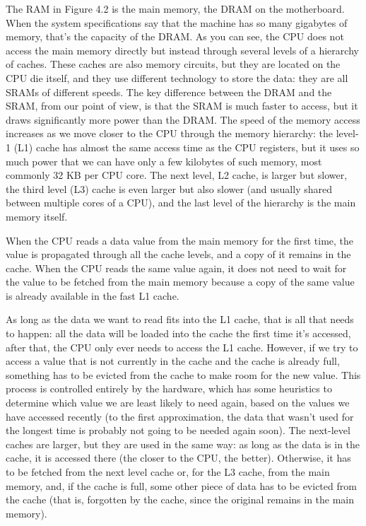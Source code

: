 The RAM in Figure 4.2 is the main memory, the DRAM on the motherboard. When the system specifications say that the machine has so many gigabytes of memory, that's the capacity of the DRAM. As you can see, the CPU does not access the main memory directly but instead through several levels of a hierarchy of caches. These caches are also memory circuits, but they are located on the CPU die itself, and they use different technology to store the data: they are all SRAMs of different speeds. The key difference between the DRAM and the SRAM, from our point of view, is that the SRAM is much faster to access, but it draws significantly more power than the DRAM. The speed of the memory access increases as we move closer to the CPU through the memory hierarchy: the level-1 (L1) cache has almost the same access time as the CPU registers, but it uses so much power that we can have only a few kilobytes of such memory, most commonly 32 KB per CPU core. The next level, L2 cache, is larger but slower, the third level (L3) cache is even larger but also slower (and usually shared between multiple cores of a CPU), and the last level of the hierarchy is the main memory itself.

When the CPU reads a data value from the main memory for the first time, the value is propagated through all the cache levels, and a copy of it remains in the cache. When the CPU reads the same value again, it does not need to wait for the value to be fetched from the main memory because a copy of the same value is already available in the fast L1 cache.

As long as the data we want to read fits into the L1 cache, that is all that needs to happen: all the data will be loaded into the cache the first time it's accessed, after that, the CPU only ever needs to access the L1 cache. However, if we try to access a value that is not currently in the cache and the cache is already full, something has to be evicted from the cache to make room for the new value. This process is controlled entirely by the hardware, which has some heuristics to determine which value we are least likely to need again, based on the values we have accessed recently (to the first approximation, the data that wasn't used for the longest time is probably not going to be needed again soon). The next-level caches are larger, but they are used in the same way: as long as the data is in the cache, it is accessed there (the closer to the CPU, the better). Otherwise, it has to be fetched from the next level cache or, for the L3 cache, from the main memory, and, if the cache is full, some other piece of data has to be evicted from the cache (that is, forgotten by the cache, since the original remains in the main memory).

